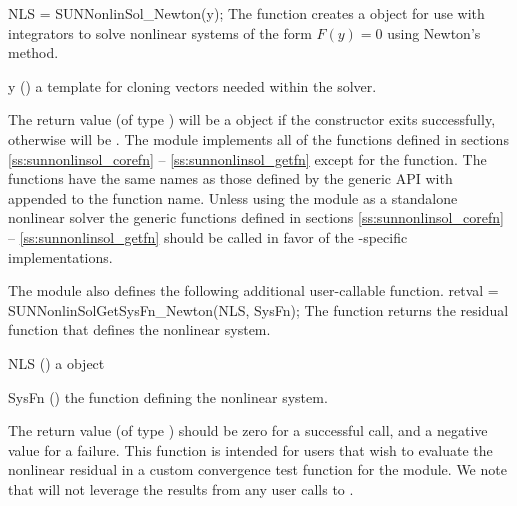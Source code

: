 {
  NLS = SUNNonlinSol\_Newton(y);
}
{
  The function  creates a
   object for use with {\sundials} integrators to
  solve nonlinear systems of the form $F(y) = 0$ using Newton's method.
}
{
  \begin{args}[y]
  \item[y] ()
    a template for cloning vectors needed within the solver.
  \end{args}
}
{
  The return value  (of type ) will be
  a {\sunnonlinsol} object if the constructor exits successfully,
  otherwise  will be .
}
{}
The {\sunnonlinsolnewton} module implements all of the functions
defined in sections \ref{ss:sunnonlinsol_corefn} --
\ref{ss:sunnonlinsol_getfn} except for the  function. The
{\sunnonlinsolnewton} functions have the same names as those defined
by the generic {\sunnonlinsol} API with  appended to the
function name. Unless using the {\sunnonlinsolnewton} module as a
standalone nonlinear solver the generic functions defined in sections
\ref{ss:sunnonlinsol_corefn} -- \ref{ss:sunnonlinsol_getfn} should be
called in favor of the {\sunnonlinsolnewton}-specific implementations.

The {\sunnonlinsolnewton} module also defines the following additional
user-callable function.
{
  retval = SUNNonlinSolGetSysFn\_Newton(NLS, SysFn);
}
{
  The function  returns the residual function
  that defines the nonlinear system.
}
{
  \begin{args}[SysFn]
  \item[NLS] ()
    a {\sunnonlinsol} object
  \item[SysFn] ()
    the function defining the nonlinear system.
  \end{args}
}
{
  The return value  (of type ) should be zero for a
  successful call, and a negative value for a failure.
}
{
  This function is intended for users that wish to evaluate the
  nonlinear residual in a custom convergence test function for the
  {\sunnonlinsolnewton} module.  We note that {\sunnonlinsolnewton}
  will not leverage the results from any user calls to .
}


